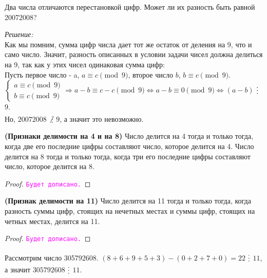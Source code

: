 \documentclass[11pt]{article}
\begin{document}
\begin{example}
	
	Два числа отличаются перестановкой цифр. Может ли их разность быть равной 20072008?
	
\end{example}
\textit{Решение:}\\
Как мы помним, сумма цифр числа дает тот же остаток от деления на 9, что и само число. Значит, разность описанных в условии задачи чисел должна делиться на 9, так как у этих чисел одинаковая сумма цифр:\\
Пусть первое число - a, $a \equiv c \pmod 9$, второе число $b$, $b \equiv c \pmod 9$.\\
$\begin{cases}a \equiv c \pmod 9 \\ b \equiv c \pmod 9 \end{cases} \Longrightarrow a - b \equiv c -c \pmod 9 \Longleftrightarrow a - b \equiv 0 \pmod 9 \Longleftrightarrow (a - b)$ $\divisible$ $9$. \\
Но, $20072008$ $\not\divisible$ $9$, а значит это невозможно.\\

\begin{theorem} \textbf{(Признаки делимости на 4 и на 8)}
	Число делится на 4 тогда и только тогда, когда две его последние цифры составляют число, которое делится на 4. Число делится на 8 тогда и только тогда, когда три его последние цифры составляют число, которое делится на 8.
\end{theorem}
\begin{proof}
    \textcolor{magenta}{\texttt{Будет дописано.}}
\end{proof}
\begin{theorem} \textbf{(Признак делимости на 11)}
    Число делится на 11 тогда и только тогда, когда разность суммы цифр, стоящих на нечетных местах и суммы цифр, стоящих на четных местах, делится на 11.
\end{theorem}
\begin{proof}
    \textcolor{magenta}{\texttt{Будет дописано.}}
\end{proof}

\begin{example}
	Рассмотрим число 305792608. $(8 + 6 + 9 + 5 + 3) - (0 + 2 + 7 + 0) = 22$ $\divisible$ $11$, а значит $305792608$ $\divisible$ $11$.
\end{example}
\end{document}
